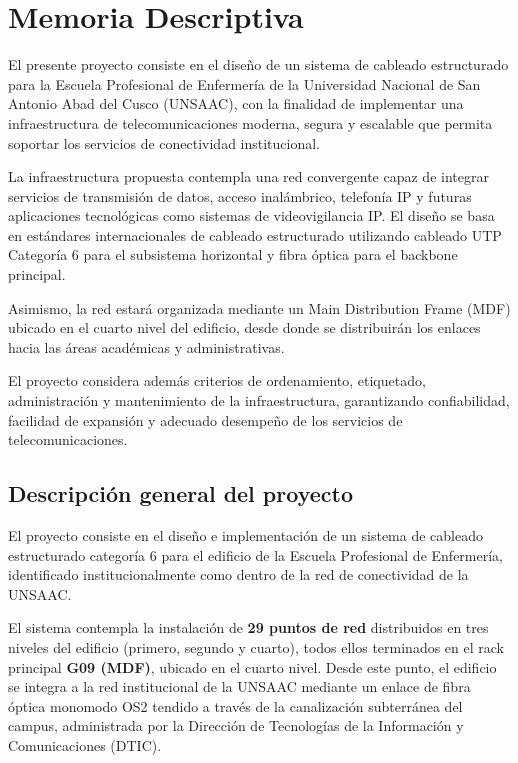 \chapter{Memoria Descriptiva}
\label{chap:memoria}

El presente proyecto consiste en el diseño de un sistema de cableado estructurado
para la Escuela Profesional de Enfermería de la Universidad Nacional de San Antonio
Abad del Cusco (UNSAAC), con la finalidad de implementar una infraestructura de
telecomunicaciones moderna, segura y escalable que permita soportar los servicios
de conectividad institucional.

La infraestructura propuesta contempla una red convergente capaz de integrar
servicios de transmisión de datos, acceso inalámbrico, telefonía IP y futuras
aplicaciones tecnológicas como sistemas de videovigilancia IP. El diseño se basa
en estándares internacionales de cableado estructurado utilizando cableado UTP
Categoría 6 para el subsistema horizontal y fibra óptica para el backbone principal.

Asimismo, la red estará organizada mediante un Main Distribution Frame (MDF)
ubicado en el cuarto nivel del edificio, desde donde se distribuirán los enlaces
hacia las áreas académicas y administrativas.

El proyecto considera además criterios de ordenamiento, etiquetado,
administración y mantenimiento de la infraestructura, garantizando confiabilidad,
facilidad de expansión y adecuado desempeño de los servicios de telecomunicaciones.

\section{Descripción general del proyecto}
\label{sec:descripcion_general}

El proyecto consiste en el diseño e implementación de un sistema de cableado
estructurado categoría 6 para el edificio de la Escuela Profesional de Enfermería,
identificado institucionalmente como dentro de la red de
conectividad de la UNSAAC.

El sistema contempla la instalación de \textbf{29 puntos de red} distribuidos en
tres niveles del edificio (primero, segundo y cuarto), todos ellos terminados en
el rack principal \textbf{G09 (MDF)}, ubicado en el cuarto nivel. Desde este punto,
el edificio se integra a la red institucional de la UNSAAC mediante un enlace de
fibra óptica monomodo OS2 tendido a través de la canalización subterránea del campus,
administrada por la Dirección de Tecnologías de la Información y Comunicaciones (DTIC).

